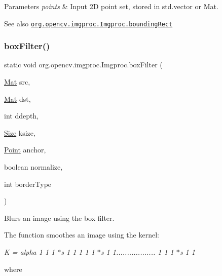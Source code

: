 \begin{DoxyParams}{Parameters}
{\em points} & Input 2D point set, stored in {\ttfamily std.\+vector} or {\ttfamily Mat}.\\
\hline
\end{DoxyParams}
\begin{DoxySeeAlso}{See also}
\href{http://docs.opencv.org/modules/imgproc/doc/structural_analysis_and_shape_descriptors.html#boundingrect}{\tt org.\+opencv.\+imgproc.\+Imgproc.\+bounding\+Rect} 
\end{DoxySeeAlso}
\mbox{\label{classorg_1_1opencv_1_1imgproc_1_1_imgproc_afb9afdc474cdb1b9242cf16ffc7017e3}} 
\subsubsection{\texorpdfstring{box\+Filter()}{boxFilter()}\hspace{0.1cm}{\footnotesize\ttfamily [1/3]}}
{\footnotesize\ttfamily static void org.\+opencv.\+imgproc.\+Imgproc.\+box\+Filter (\begin{DoxyParamCaption}\item[{\mbox{\hyperlink{classorg_1_1opencv_1_1core_1_1_mat}{Mat}}}]{src,  }\item[{\mbox{\hyperlink{classorg_1_1opencv_1_1core_1_1_mat}{Mat}}}]{dst,  }\item[{int}]{ddepth,  }\item[{\mbox{\hyperlink{classorg_1_1opencv_1_1core_1_1_size}{Size}}}]{ksize,  }\item[{\mbox{\hyperlink{classorg_1_1opencv_1_1core_1_1_point}{Point}}}]{anchor,  }\item[{boolean}]{normalize,  }\item[{int}]{border\+Type }\end{DoxyParamCaption})\hspace{0.3cm}{\ttfamily [static]}}

Blurs an image using the box filter.

The function smoothes an image using the kernel\+:

{\itshape K = alpha 1 1 1 $\ast$s 1 1 1 1 1 $\ast$s 1 1.................. 1 1 1 $\ast$s 1 1 }

where

